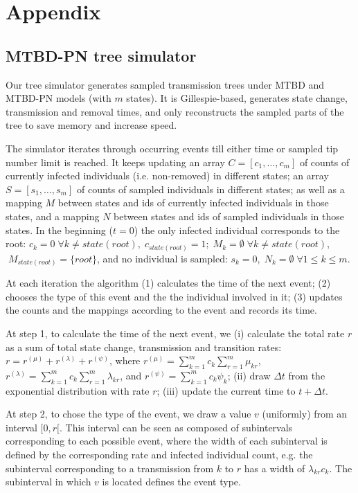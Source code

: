 \documentclass[a4paper,10pt]{article}
\begin{document}



\section{Appendix}


\subsection{MTBD-PN tree simulator}

Our tree simulator generates sampled transmission trees under MTBD and MTBD-PN models (with $m$ states). It is Gillespie-based, generates state change, transmission and removal times, and only reconstructs the sampled parts of the tree to save memory and increase speed.  

The simulator iterates through occurring events till either time or sampled tip number limit is reached. 
It keeps updating an array $C = [c_1, \ldots, c_m]$ of counts of currently infected individuals (i.e. non-removed) in different states; an array $S = [s_1, \ldots, s_m]$ of counts of sampled individuals in different states; as well as a mapping $M$ between states and ids of currently infected individuals in those states, and a mapping $N$ between states and ids of sampled individuals in those states.  In the beginning ($t=0$) the only infected individual corresponds to the root: $c_k = 0 \;\forall k \neq state(root), \;c_{state(root)} = 1; \;M_k = \emptyset \; \forall k \neq state(root)$, $ \; M_{state(root)} = \{root\}$, and no individual is sampled: $s_k=0,\;N_k = \emptyset \; \forall 1 \leq k \leq m$.

At each iteration the algorithm (1) calculates the time of the next event; (2) chooses the type of this event and the the individual involved in it; (3) updates the counts and the mappings according to the event and records its time.

At step 1, to calculate the time of the next event, we (i) calculate the total rate $r$ as a sum of total state change, transmission and transition rates: $r = r^{(\mu)} + r^{(\lambda)} + r^{(\psi)}$, where $r^{(\mu)} = \sum\limits_{k=1}^{m} c_k \sum\limits_{r=1}^{m} \mu_{kr}$, $r^{(\lambda)} = \sum\limits_{k=1}^{m} c_k \sum\limits_{r=1}^{m} \lambda_{kr}$, and $r^{(\psi)} = \sum\limits_{k=1}^{m} c_k \psi_{k}$; (ii) draw $\Delta t$ from the exponential distribution with rate $r$; (iii) update the current time to $t + \Delta t$.

At step 2, to chose the type of the event, we draw a value $v$ (uniformly) from an interval $[0, r[$. This interval can be seen as composed of subintervals corresponding to each possible event, where the width of each subinterval is defined by the corresponding rate and infected individual count, e.g. the subinterval corresponding to a transmission from $k$ to $r$ has a width of $\lambda_{kr}c_k$. The subinterval in which $v$ is located defines the event type.
\end{document}
